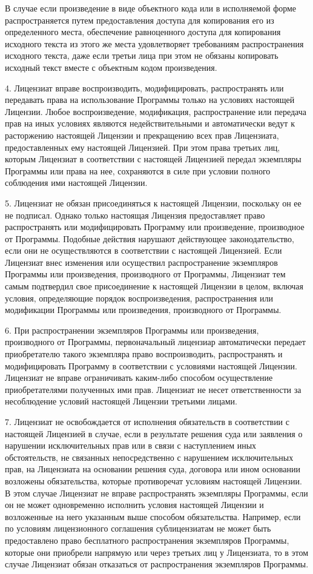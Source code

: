 \begin{small}
В случае если произведение в виде объектного кода или в исполняемой форме
распространяется путем предоставления доступа для копирования его из
определенного места, обеспечение равноценного доступа для копирования
исходного текста из этого же места удовлетворяет требованиям
распространения исходного текста, даже если третьи лица при этом не
обязаны копировать исходный текст вместе с объектным кодом произведения.

4. Лицензиат вправе воспроизводить, модифицировать, распространять или
передавать права на использование Программы только на условиях настоящей
Лицензии. Любое воспроизведение, модификация, распространение или
передача прав на иных условиях являются недействительными и автоматически
ведут к расторжению настоящей Лицензии и прекращению всех прав Лицензиата,
предоставленных ему настоящей Лицензией. При этом права третьих лиц,
которым Лицензиат в соответствии с настоящей Лицензией передал экземпляры
Программы или права на нее, сохраняются в силе при условии полного
соблюдения ими настоящей Лицензии.

5. Лицензиат не обязан присоединяться к настоящей Лицензии, поскольку он
ее не подписал. Однако только настоящая Лицензия предоставляет право
распространять или модифицировать Программу или произведение, производное
от Программы. Подобные действия нарушают действующее законодательство,
если они не осуществляются в соответствии с настоящей Лицензией. Если
Лицензиат внес изменения или осуществил распространение экземпляров
Программы или произведения, производного от Программы, Лицензиат тем
самым подтвердил свое присоединение к настоящей Лицензии в целом, включая
условия, определяющие порядок воспроизведения, распространения или
модификации Программы или произведения, производного от Программы.

6. При распространении экземпляров Программы или произведения,
производного от Программы, первоначальный лицензиар автоматически
передает приобретателю такого экземпляра право воспроизводить,
распространять и модифицировать Программу в соответствии с условиями
настоящей Лицензии. Лицензиат не вправе ограничивать каким-либо способом
осуществление приобретателями полученных ими прав. Лицензиат не несет
ответственности за несоблюдение условий настоящей Лицензии третьими
лицами.

7. Лицензиат не освобождается от исполнения обязательств в соответствии
с настоящей Лицензией в случае, если в результате решения суда или
заявления о нарушении исключительных прав или в связи с наступлением
иных обстоятельств, не связанных непосредственно с нарушением
исключительных прав, на Лицензиата на основании решения суда, договора
или ином основании возложены обязательства, которые противоречат
условиям настоящей Лицензии. В этом случае Лицензиат не вправе
распространять экземпляры Программы, если он не может одновременно
исполнить условия настоящей Лицензии и возложенные на него указанным
выше способом обязательства. Например, если по условиям лицензионного
соглашения сублицензиатам не может быть предоставлено право бесплатного
распространения экземпляров Программы, которые они приобрели напрямую
или через третьих лиц у Лицензиата, то в этом случае Лицензиат обязан
отказаться от распространения экземпляров Программы.


\end{small}
